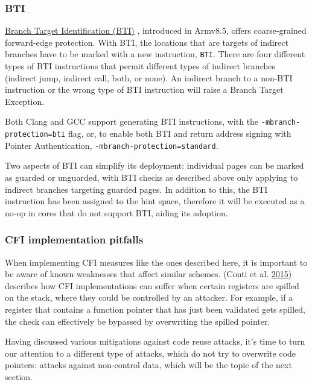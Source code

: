 \documentclass[a4paper,]{report}
\begin{document}
\hypertarget{bti}{%
\subsubsection{BTI}\label{bti}}

\href{https://developer.arm.com/documentation/102433/0100/Jump-oriented-programming?lang=en}{Branch
Target Identification (BTI)} , introduced in Armv8.5, offers
coarse-grained forward-edge protection. With BTI, the locations that are
targets of indirect branches have to be marked with a new instruction,
\texttt{BTI}. There are four different types of BTI instructions that
permit different types of indirect branches (indirect jump, indirect
call, both, or none). An indirect branch to a non-BTI instruction or the
wrong type of BTI instruction will raise a Branch Target Exception.

Both Clang and GCC support generating BTI instructions, with the
\texttt{-mbranch-protection=bti} flag, or, to enable both BTI and return
address signing with Pointer Authentication,
\texttt{-mbranch-protection=standard}.

Two aspects of BTI can simplify its deployment: individual pages can be
marked as guarded or unguarded, with BTI checks as described above only
applying to indirect branches targeting guarded pages. In addition to
this, the BTI instruction has been assigned to the hint space, therefore
it will be executed as a no-op in cores that do not support BTI, aiding
its adoption.

\hypertarget{cfi-implementation-pitfalls}{%
\subsubsection{CFI implementation
pitfalls}\label{cfi-implementation-pitfalls}}

When implementing CFI measures like the ones described here, it is
important to be aware of known weaknesses that affect similar schemes.
(Conti et al. \protect\hyperlink{ref-Conti2015}{2015}) describes how CFI
implementations can suffer when certain registers are spilled on the
stack, where they could be controlled by an attacker. For example, if a
register that contains a function pointer that has just been validated
gets spilled, the check can effectively be bypassed by overwriting the
spilled pointer.

Having discussed various mitigations against code reuse attacks, it's
time to turn our attention to a different type of attacks, which do not
try to overwrite code pointers: attacks against non-control data, which
will be the topic of the next section.
\end{document}
